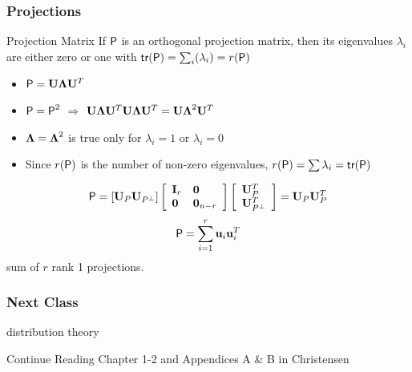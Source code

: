 \documentclass{beamer}
\begin{document}
\begin{frame}
  \frametitle{Projections}
\begin{block}{Projection Matrix}
If $\P$ is an orthogonal projection matrix, then its eigenvalues
$\lambda_i$ are
either zero or one with $\tr (\P) = \sum_i(\lambda_i) = r(\P)$
\end{block} \pause
\begin{itemize}
\item   $\P = \U \Lambdab \U^T $  \pause
\item $\P = \P^2$  $\Rightarrow$ $\U \Lambdab \U^T\U \Lambdab \U^T =
  \U\Lambdab^2\U^T$  \pause
\item $\Lambdab = \Lambdab^2$ is true only for $\lambda_i = 1$ or
  $\lambda_i =0$  \pause
\item Since $r(\P)$ is the number of non-zero eigenvalues, $r(\P) =
  \sum \lambda_i = \tr(\P)$  \pause
\end{itemize}
$$\P = \left[\U_P \U_{P^\perp} \right] 
\left[
  \begin{array}{ll}
    \I_r & \zero \\
    \zero & \zero_{n-r}
  \end{array}
\right] \left[
  \begin{array}{l}
    \U_P^T \\
\U^T_{P^\perp}
  \end{array}
\right] = \U_P \U^T_P$$
$$\P = \sum_{i=1}^r \u_i \u_i^T$$  
sum of $r$ rank 1 projections.
\end{frame}

\begin{frame}\frametitle{Next Class}
  
  distribution theory 

  Continue Reading Chapter 1-2 and Appendices A \& B in Christensen
\end{frame}
\end{document}

